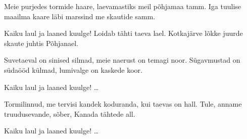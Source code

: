 Meie purjedes tormide haare,
laevamastiks meil p\~ohjamaa tamm.
Iga tuulise maailma kaare
l\"abi marssind me skautide samm.

Kaiku laul ja laaned kuulge!
Loidab t\"ahti taeva lael.
Kotkaj\"arve l\~okke juurde
skaute juhtis P\~ohjanael.

Suvetaeval on sinised silmad,
meie naerust on temagi noor.
S\"ugavmustad on s\"uda\"o\"od k\"ulmad,
lumivalge on kaskede koor.

Kaiku laul ja laaned kuulge! \ldots

Tormilinnud, me tervisi kandek
koduranda, kui taevas on hall.
Tule, anname truudusevande,
s\~ober, Kanada t\"ahtede all.

Kaiku laul ja laaned kuulge! \ldots